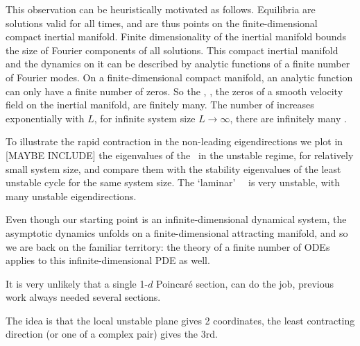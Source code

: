 This observation can be heuristically motivated as follows.
Equilibria are solutions valid for all times, and are thus points
on the finite-dimensional compact inertial manifold.
Finite dimensionality of the inertial manifold
bounds the size of Fourier components of all solutions.
This
compact inertial manifold and the dynamics on it can be
described by analytic functions of a finite number of Fourier modes.
On a finite-dimensional compact manifold,
an analytic function can only have a finite number
of zeros. So the {\eqva}, {\ie},
the zeros of a smooth velocity field on
the inertial manifold, are finitely many.
The number of {\eqva} increases exponentially with $L$,
for infinite system size $L \to \infty$,
there are infinitely many {\eqva}.

\bigskip

To illustrate the rapid contraction in the non-leading eigendirections
we plot  in [MAYBE INCLUDE] %
the eigenvalues of the \eqv\ in the unstable regime,
for relatively small system size, %
and compare them with the
stability eigenvalues of the least unstable cycle for the same
system size.
The `laminar' ~\eqv\ is very unstable,
with many unstable eigendirections.


\bigskip

Even though our starting point  is an infinite-dimensional
dynamical system, the asymptotic dynamics unfolds on a
finite-dimensional attracting manifold, and so we are back on the
familiar territory: the theory of a finite number of ODEs applies to
this infinite-dimensional PDE as well.

\bigskip

It is very unlikely that a single 1-$d$ Poincar\'e section,
can do the job, previous work
always needed several sections.

The idea is that the local unstable plane gives 2 coordinates, the
least contracting direction (or one of a complex pair) gives the 3rd.

